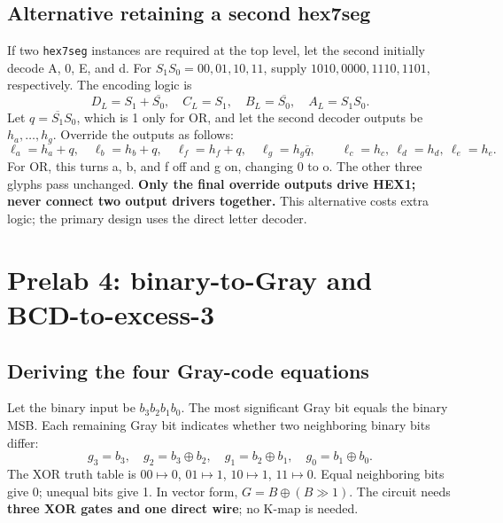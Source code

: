\documentclass[a4paper,11pt]{article}
\begin{document}
\subsection{Alternative retaining a second hex7seg}\label{sec:lettervariant}
If two \texttt{hex7seg} instances are required at the top level, let the second initially
decode A, 0, E, and d. For $S_1S_0=00,01,10,11$, supply $1010,0000,1110,1101$,
respectively. The encoding logic is
\[
D_L=S_1+\overline{S_0},\quad C_L=S_1,\quad B_L=\overline{S_0},\quad A_L=S_1S_0.
\]
Let $q=\overline{S_1}S_0$, which is 1 only for OR, and let the second decoder outputs
be $h_a,\ldots,h_g$. Override the outputs as follows:
\[
\ell_a=h_a+q,\quad\ell_b=h_b+q,\quad\ell_f=h_f+q,\quad\ell_g=h_g\overline q,
\qquad\ell_c=h_c,\ \ell_d=h_d,\ \ell_e=h_e.
\]
For OR, this turns a, b, and f off and g on, changing 0 to o. The other three glyphs pass
unchanged. \textbf{Only the final override outputs drive HEX1; never connect two output
drivers together.} This alternative costs extra logic; the primary design uses the
direct letter decoder.

\clearpage\section{Prelab 4: binary-to-Gray and BCD-to-excess-3}
\subsection{Deriving the four Gray-code equations}
Let the binary input be $b_3b_2b_1b_0$. The most significant Gray bit equals the binary
MSB. Each remaining Gray bit indicates whether two neighboring binary bits differ:
\[
\boxed{g_3=b_3,\quad g_2=b_3\oplus b_2,\quad g_1=b_2\oplus b_1,\quad g_0=b_1\oplus b_0.}
\]
The XOR truth table is $00\mapsto0$, $01\mapsto1$, $10\mapsto1$, $11\mapsto0$.
Equal neighboring bits give 0; unequal bits give 1. In vector form,
$G=B\oplus(B\!\gg\!1)$. The circuit needs \textbf{three XOR gates and one direct wire};
no K-map is needed.


\begin{center}\end{center}
\end{document}
